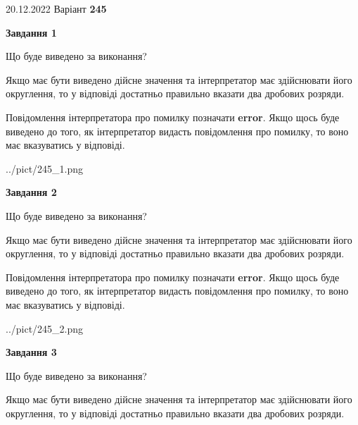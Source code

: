 \documentclass[12pt, ukrainian]{article}
\begin{document}
{20.12.2022 Варіант \No \textbf { 245 }\par}
{
\begin {Large}

{\begin {center}\textbf{Завдання 1}\end {center}}\par
Що буде виведено за виконання? \par

Якщо має бути виведено дійсне значення та інтерпретатор має здійснювати його округлення, 
то у відповіді достатньо правильно вказати два дробових розряди.

Повідомлення інтерпретатора про помилку позначати \textbf{error}.
Якщо щось буде виведено до того, як інтерпретатор видасть повідомлення про помилку, 
то воно має вказуватись у відповіді. \par

\begin{center}
	{../pict/245_1.png}
\end{center}
\newpage

{\begin {center}\textbf{Завдання 2}\end {center}}\par
Що буде виведено за виконання? \par

Якщо має бути виведено дійсне значення та інтерпретатор має здійснювати його округлення, 
то у відповіді достатньо правильно вказати два дробових розряди.

Повідомлення інтерпретатора про помилку позначати \textbf{error}.
Якщо щось буде виведено до того, як інтерпретатор видасть повідомлення про помилку, 
то воно має вказуватись у відповіді. \par

\begin{center}
	{../pict/245_2.png}
\end{center}
\newpage

{\begin {center}\textbf{Завдання 3}\end {center}}\par
Що буде виведено за виконання? \par

Якщо має бути виведено дійсне значення та інтерпретатор має здійснювати його округлення, 
то у відповіді достатньо правильно вказати два дробових розряди.


\end{Large}}
\end{document}
